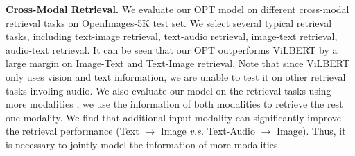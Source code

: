 \documentclass[10pt,twocolumn,letterpaper]{article}
\begin{document}
\begin{table}[!t]
\begin{center}
\caption{Results on text generation for audio recognition task. The performance is evaluated on OpenImages-5K test set.}
\label{tab:sr}
\end{center}
\end{table}

\textbf{Cross-Modal Retrieval.} We evaluate our OPT model on different cross-modal retrieval tasks on OpenImages-5K test set. We select several typical retrieval tasks, including text-image retrieval, text-audio retrieval, image-text retrieval, audio-text retrieval. It can be seen that our OPT outperforms ViLBERT \cite{lvilbert} by a large margin on Image-Text and Text-Image retrieval. Note that since ViLBERT only uses vision and text information, we are unable to test it on other retrieval tasks involing audio. We also evaluate our model on the retrieval tasks using more modalities \ie, we use the information of both modalities to retrieve the rest one modality. We find that additional input modality can significantly improve the retrieval performance (\eg Text $\to$ Image \textit{v.s.} Text-Audio $\to$ Image). Thus, it is necessary to jointly model the information of more modalities. 

\begin{table}[!t]
\begin{center}
\caption{Ablation studies of our model on multi-modal classification task.}
\label{tab:as}
\end{center}
\end{table}
\end{document}
